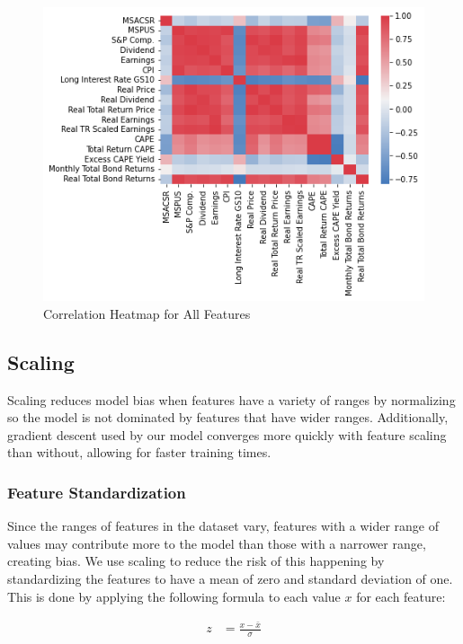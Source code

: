 \documentclass [MS] {uclathes}
\begin{document}
\begin{figure}[h!]
    \centering
    \includegraphics[scale=0.75]{figures/feature_corr_heatmap.png}
    \caption{Correlation Heatmap for All Features}
    \label{fig:feature_corr_heatmap}
\end{figure}


\subsection{Scaling}

Scaling reduces model bias when features have a variety of ranges by normalizing so the model is not dominated by features that have wider ranges. Additionally, gradient descent used by our model converges more quickly with feature scaling than without, allowing for faster training times.\cite{DBLP:journals/corr/IoffeS15}


\subsubsection{Feature Standardization}

Since the ranges of features in the dataset vary, features with a wider range of values may contribute more to the model than those with a narrower range, creating bias. We use scaling to reduce the risk of this happening by standardizing the features to have a mean of zero and standard deviation of one. This is done by applying the following formula to each value $x$ for each feature:

$$
\begin{aligned}
z &= \frac{x - \bar{x}}{\sigma} \\
\end{aligned}
$$
\end{document}
